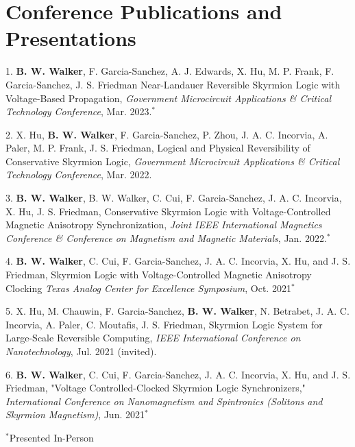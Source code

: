 \documentclass[letterpaper,11pt]{article}
\begin{document}
\section{Conference Publications and Presentations}
    \begin{itemize}[leftmargin=0.15in, label={}]
        \small{\item{
         1.\textbf{\hspace{3pt} B. W. Walker}, F. Garcia-Sanchez, A. J. Edwards, X. Hu, M. P. Frank, F. Garcia-Sanchez, J. S. Friedman Near-Landauer Reversible Skyrmion Logic with Voltage-Based Propagation, \textit{Government Microcircuit Applications \& Critical Technology Conference}, Mar. 2023.$^{*}$
         }}\vspace{-5pt}
        \small{\item{
         2.\hspace{3pt} X. Hu, \textbf{B. W. Walker}, F. Garcia-Sanchez, P. Zhou, J. A. C. Incorvia, A. Paler, M. P. Frank, J. S. Friedman, Logical and Physical Reversibility of Conservative Skyrmion Logic, \textit{Government Microcircuit Applications \& Critical Technology Conference}, Mar. 2022.
         }}\vspace{-5pt}
         \small{\item{
         3.\textbf{\hspace{3pt} B. W. Walker}, B. W. Walker, C. Cui, F. Garcia-Sanchez, J. A. C. Incorvia, X. Hu, J. S. Friedman, Conservative Skyrmion Logic with Voltage-Controlled Magnetic Anisotropy Synchronization, \textit{Joint IEEE International Magnetics Conference \& Conference on Magnetism and Magnetic Materials}, Jan. 2022.$^{*}$
        }}\vspace{-5pt}
        \small{\item{
         4.\textbf{\hspace{3pt} B. W. Walker}{, C. Cui, F. Garcia-Sanchez, J. A. C. Incorvia, X. Hu, and J. S. Friedman, Skyrmion Logic with Voltage-Controlled Magnetic Anisotropy Clocking \textit{Texas Analog Center for Excellence Symposium}, Oct. 2021}$^{*}$
        }}\vspace{-5pt}
        \small{\item{
         5.\hspace{3pt} X. Hu, M. Chauwin, F. Garcia-Sanchez, \textbf{B. W. Walker}, N. Betrabet, J. A. C. Incorvia, A. Paler, C. Moutafis, J. S. Friedman, Skyrmion Logic System for Large-Scale Reversible Computing, \textit{IEEE International Conference on Nanotechnology}, Jul. 2021 (invited).
        }}\vspace{-5pt}
        \small{\item{
         6.\textbf{\hspace{3pt} B. W. Walker}{, C. Cui, F. Garcia-Sanchez, J. A. C. Incorvia, X. Hu, and J. S. Friedman, "Voltage Controlled-Clocked Skyrmion Logic Synchronizers," \textit{International Conference on Nanomagnetism and Spintronics (Solitons and Skyrmion Magnetism)}, Jun. 2021}$^{*}$
        }}
     \end{itemize}
     \vspace{-15pt}\hspace{400pt}$^{*}$Presented In-Person\vspace{-15pt}
\end{document}
